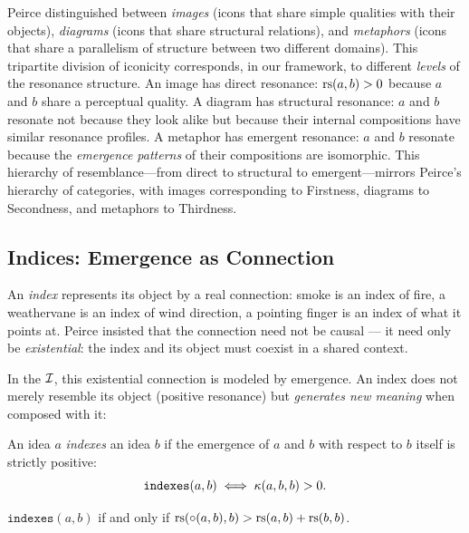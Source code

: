 \begin{remark}
Peirce distinguished between \emph{images} (icons that share simple qualities with their objects), \emph{diagrams} (icons that share structural relations), and \emph{metaphors} (icons that share a parallelism of structure between two different domains). This tripartite division of iconicity corresponds, in our framework, to different \emph{levels} of the resonance structure. An image has direct resonance: $\mathrm{rs}(a, b) > 0$ because $a$ and $b$ share a perceptual quality. A diagram has structural resonance: $a$ and $b$ resonate not because they look alike but because their internal compositions have similar resonance profiles. A metaphor has emergent resonance: $a$ and $b$ resonate because the \emph{emergence patterns} of their compositions are isomorphic. This hierarchy of resemblance---from direct to structural to emergent---mirrors Peirce's hierarchy of categories, with images corresponding to Firstness, diagrams to Secondness, and metaphors to Thirdness.
\end{remark}

\subsection{Indices: Emergence as Connection}

An \emph{index} represents its object by a real connection: smoke is
an index of fire, a weathervane is an index of wind direction, a
pointing finger is an index of what it points at. Peirce insisted
that the connection need not be causal --- it need only be
\emph{existential}: the index and its object must coexist in a
shared context.

In the $\mathcal{I}$, this existential connection is modeled by emergence.
An index does not merely resemble its object (positive resonance)
but \emph{generates new meaning} when composed with it:

\begin{definition}
\label{def:indexes}
An idea $a$ \emph{indexes} an idea $b$ if the emergence of $a$
and $b$ with respect to $b$ itself is strictly positive:
\[
  \texttt{indexes}(a, b) \iff \kappa(a, b, b) > 0.
\]
\end{definition}

\begin{theorem}
\label{thm:indexes-emergence}
$\texttt{indexes}(a, b)$ if and only if
$\mathrm{rs}(\circ(a, b), b) > \mathrm{rs}(a, b) + \mathrm{rs}(b, b)$.
\end{theorem}

